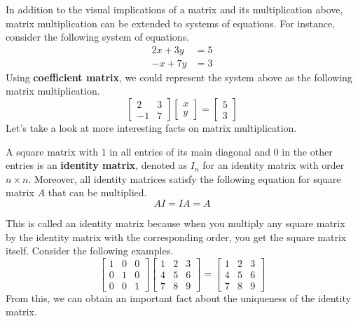 \documentclass[../main.tex]{subfiles}
\begin{document}
In addition to the visual implications of a matrix and its
multiplication above, matrix multiplication can be extended to
systems of equations. For instance, consider the following system
of equations.
\begin{align*}
    2x + 3y &= 5 \\
    -x + 7y &= 3
\end{align*}
Using \textbf{coefficient matrix}, we could represent the system
above as the following matrix multiplication.
\[
\begin{bmatrix}
    2  & 3 \\
    -1 & 7
\end{bmatrix}
\begin{bmatrix}
    x \\
    y
\end{bmatrix}
=
\begin{bmatrix}
    5 \\
    3
\end{bmatrix}
\]
Let's take a look at more interesting facts on matrix multiplication.

\begin{definition}
A square matrix with $1$ in all entries of its main diagonal and
$0$ in the other entries is an \textbf{identity matrix}, denoted as
$I_n$ for an identity matrix with order $n \times n$. Moreover,
all identity matrices satisfy the following equation for square
matrix $A$ that can be multiplied.
\[
AI = IA = A
\]
\end{definition}

This is called an identity matrix because when you multiply any
square matrix by the identity matrix with the corresponding order,
you get the square matrix itself. Consider the following examples.
\[
\begin{bmatrix}
    1 & 0 & 0 \\
    0 & 1 & 0 \\
    0 & 0 & 1
\end{bmatrix}
\begin{bmatrix}
    1 & 2 & 3 \\
    4 & 5 & 6 \\
    7 & 8 & 9
\end{bmatrix}
=
\begin{bmatrix}
    1 & 2 & 3 \\
    4 & 5 & 6 \\
    7 & 8 & 9
\end{bmatrix}
\]
From this, we can obtain an important fact about the uniqueness
of the identity matrix.
\end{document}
